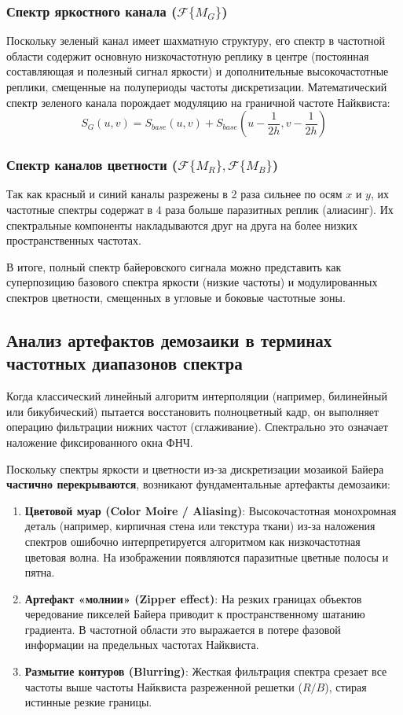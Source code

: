 \documentclass[12pt,a4paper]{article}
\begin{document}
\subsubsection{Спектр яркостного канала ($\mathcal{F}\{M_G\}$)}
Поскольку зеленый канал имеет шахматную структуру, его спектр в частотной области содержит основную низкочастотную реплику в центре (постоянная составляющая и полезный сигнал яркости) и дополнительные высокочастотные реплики, смещенные на полупериоды частоты дискретизации. Математический спектр зеленого канала порождает модуляцию на граничной частоте Найквиста:
\begin{equation}
    S_G(u, v) = S_{base}(u, v) + S_{base}\left(u - \frac{1}{2h}, v - \frac{1}{2h}\right)
\end{equation}

\subsubsection{Спектр каналов цветности ($\mathcal{F}\{M_R\}, \mathcal{F}\{M_B\}$)}
Так как красный и синий каналы разрежены в 2 раза сильнее по осям $x$ и $y$, их частотные спектры содержат в 4 раза больше паразитных реплик (алиасинг). Их спектральные компоненты накладываются друг на друга на более низких пространственных частотах.

В итоге, полный спектр байеровского сигнала можно представить как суперпозицию базового спектра яркости (низкие частоты) и модулированных спектров цветности, смещенных в угловые и боковые частотные зоны.

\subsection{Анализ артефактов демозаики в терминах частотных диапазонов спектра}
Когда классический линейный алгоритм интерполяции (например, билинейный или бикубический) пытается восстановить полноцветный кадр, он выполняет операцию фильтрации нижних частот (сглаживание). Спектрально это означает наложение фиксированного окна ФНЧ.

Поскольку спектры яркости и цветности из-за дискретизации мозаикой Байера \textbf{частично перекрываются}, возникают фундаментальные артефакты демозаики:
\begin{enumerate}
    \item \textbf{Цветовой муар (Color Moire / Aliasing)}: Высокочастотная монохромная деталь (например, кирпичная стена или текстура ткани) из-за наложения спектров ошибочно интерпретируется алгоритмом как низкочастотная цветовая волна. На изображении появляются паразитные цветные полосы и пятна.
    \item \textbf{Артефакт «молнии» (Zipper effect)}: На резких границах объектов чередование пикселей Байера приводит к пространственному шатанию градиента. В частотной области это выражается в потере фазовой информации на предельных частотах Найквиста.
    \item \textbf{Размытие контуров (Blurring)}: Жесткая фильтрация спектра срезает все частоты выше частоты Найквиста разреженной решетки ($R/B$), стирая истинные резкие границы.
\end{enumerate}
\end{document}
